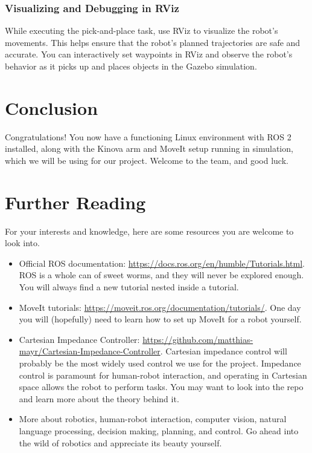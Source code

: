 \documentclass{article}
\begin{document}
\subsubsection{Visualizing and Debugging in RViz}
While executing the pick-and-place task, use RViz to visualize the robot’s movements. This helps ensure that the robot's planned trajectories are safe and accurate. You can interactively set waypoints in RViz and observe the robot's behavior as it picks up and places objects in the Gazebo simulation.

\section{Conclusion}
Congratulations! You now have a functioning Linux environment with ROS 2 installed, along with the Kinova arm and MoveIt setup running in simulation, which we will be using for our project. Welcome to the team, and good luck.

\section{Further Reading}
For your interests and knowledge, here are some resources you are welcome to look into.
\begin{itemize}
    \item Official ROS documentation: \url{https://docs.ros.org/en/humble/Tutorials.html}. ROS is a whole can of sweet worms, and they will never be explored enough. You will always find a new tutorial nested inside a tutorial.
    \item MoveIt tutorials: \url{https://moveit.ros.org/documentation/tutorials/}. One day you will (hopefully) need to learn how to set up MoveIt for a robot yourself.
    \item Cartesian Impedance Controller:
    \url{https://github.com/matthias-mayr/Cartesian-Impedance-Controller}. Cartesian impedance control will probably be the most widely used control we use for the project. Impedance control is paramount for human-robot interaction, and operating in Cartesian space allows the robot to perform tasks. You may want to look into the repo and learn more about the theory behind it.
    \item More about robotics, human-robot interaction, computer vision, natural language processing, decision making, planning, and control. Go ahead into the wild of robotics and appreciate its beauty yourself.
\end{itemize}
\end{document}
